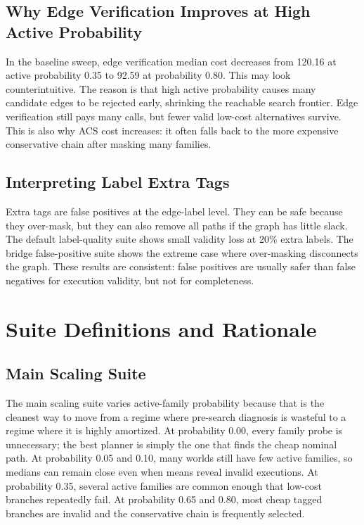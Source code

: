 \documentclass{article}
\newcommand{\ACS}{\textsc{ACS}}
\begin{document}
\subsection{Why Edge Verification Improves at High Active Probability}

In the baseline sweep, edge verification median cost decreases from 120.16 at active probability 0.35 to 92.59 at probability 0.80. This may look counterintuitive. The reason is that high active probability causes many candidate edges to be rejected early, shrinking the reachable search frontier. Edge verification still pays many calls, but fewer valid low-cost alternatives survive. This is also why \ACS{} cost increases: it often falls back to the more expensive conservative chain after masking many families.

\subsection{Interpreting Label Extra Tags}

Extra tags are false positives at the edge-label level. They can be safe because they over-mask, but they can also remove all paths if the graph has little slack. The default label-quality suite shows small validity loss at 20\% extra labels. The bridge false-positive suite shows the extreme case where over-masking disconnects the graph. These results are consistent: false positives are usually safer than false negatives for execution validity, but not for completeness.

\section{Suite Definitions and Rationale}

\subsection{Main Scaling Suite}

The main scaling suite varies active-family probability because that is the cleanest way to move from a regime where pre-search diagnosis is wasteful to a regime where it is highly amortized. At probability 0.00, every family probe is unnecessary; the best planner is simply the one that finds the cheap nominal path. At probability 0.05 and 0.10, many worlds still have few active families, so medians can remain close even when means reveal invalid executions. At probability 0.35, several active families are common enough that low-cost branches repeatedly fail. At probability 0.65 and 0.80, most cheap tagged branches are invalid and the conservative chain is frequently selected.
\end{document}
